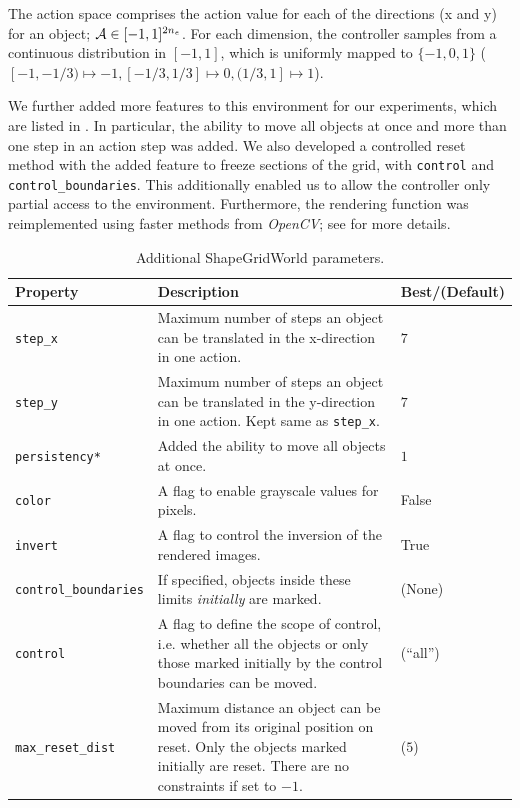 The action space comprises the action value for each of the directions (x and y) for an object; \(\mathcal{A} \in [-1, 1]^{2 n_e}\).
For each dimension, the controller samples from a continuous distribution in \([-1, 1]\), which is uniformly mapped to \(\{-1, 0, 1\}\) (\([-1, -1/3) \mapsto -1, [-1/3, 1/3] \mapsto 0, (1/3, 1] \mapsto 1\)).

We further added more features to this environment for our experiments, which are listed in .
In particular, the ability to move all objects at once and more than one step in an action step was added.
We also developed a controlled reset method with the added feature to freeze sections of the grid, with \texttt{control} and \texttt{control\_boundaries}.
This additionally enabled us to allow the controller only partial access to the environment.
Furthermore, the rendering function was reimplemented using faster methods from \emph{OpenCV}; see  for more details.

\begin{table}[H]
    \centering
    \caption{Additional ShapeGridWorld parameters.}
    \begin{tabularx}{\textwidth}{C{3.9cm} L C{2cm}}
        \hline
        Property & Description & Best/(Default)\\
        \hline
        \texttt{step\_x} & Maximum number of steps an object can be translated in the x-direction in one action. & \(7\)\\
        \texttt{step\_y} & Maximum number of steps an object can be translated in the y-direction in one action. Kept same as \texttt{step\_x}. & \(7\)\\
        \texttt{persistency*} & Added the ability to move all objects at once. & \(1\)\\
        \texttt{color} & A flag to enable grayscale values for pixels. & False\\
        \texttt{invert} & A flag to control the inversion of the rendered images.  & True\\
        \texttt{control\_boundaries} & If specified, objects inside these limits \emph{initially} are marked. & (None)\\
        \texttt{control} & A flag to define the scope of control, i.e. whether all the objects or only those marked initially by the control boundaries can be moved. & (``all'')\\
        \texttt{max\_reset\_dist} & Maximum distance an object can be moved from its original position on reset. Only the objects marked initially are reset. There are no constraints if set to \(-1\). & (\(5\))\\
        \hline
    \end{tabularx}
    \label{tab:additional-sgw-params}
\end{table}

